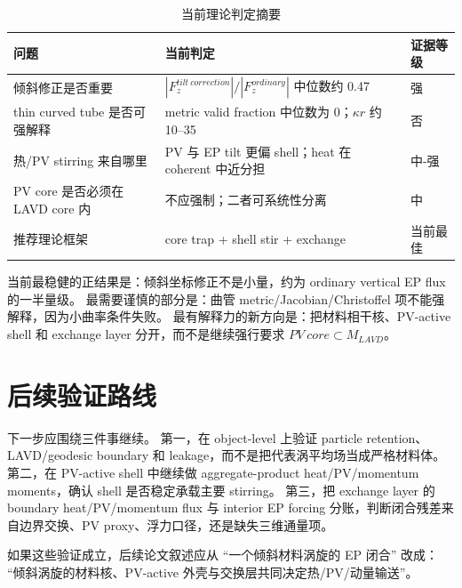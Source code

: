 \documentclass[UTF8,12pt]{ctexart}
\begin{document}
\begin{table}[H]
\centering
\caption{当前理论判定摘要}
\begin{tabular}{p{4.0cm}p{8.6cm}p{2.1cm}}
\toprule
问题 & 当前判定 & 证据等级\\
\midrule
倾斜修正是否重要 & \(|F_z^{tilt\ correction}|/|F_z^{ordinary}|\) 中位数约 0.47 & 强\\
thin curved tube 是否可强解释 & metric valid fraction 中位数为 0；\(\kappa r\) 约 10--35 & 否\\
热/PV stirring 来自哪里 & PV 与 EP tilt 更偏 shell；heat 在 coherent 中近分担 & 中-强\\
PV core 是否必须在 LAVD core 内 & 不应强制；二者可系统性分离 & 中\\
推荐理论框架 & core trap + shell stir + exchange & 当前最佳\\
\bottomrule
\end{tabular}
\end{table}

当前最稳健的正结果是：倾斜坐标修正不是小量，约为 ordinary vertical EP flux 的一半量级。
最需要谨慎的部分是：曲管 metric/Jacobian/Christoffel 项不能强解释，因为小曲率条件失败。
最有解释力的新方向是：把材料相干核、PV-active shell 和 exchange layer 分开，而不是继续强行要求 \(PV\ core \subset M_{LAVD}\)。

\section{后续验证路线}

下一步应围绕三件事继续。
第一，在 object-level 上验证 particle retention、LAVD/geodesic boundary 和 leakage，而不是把代表涡平均场当成严格材料体。
第二，在 PV-active shell 中继续做 aggregate-product heat/PV/momentum moments，确认 shell 是否稳定承载主要 stirring。
第三，把 exchange layer 的 boundary heat/PV/momentum flux 与 interior EP forcing 分账，判断闭合残差来自边界交换、PV proxy、浮力口径，还是缺失三维通量项。

如果这些验证成立，后续论文叙述应从 ``一个倾斜材料涡旋的 EP 闭合'' 改成：
``倾斜涡旋的材料核、PV-active 外壳与交换层共同决定热/PV/动量输送''。
\end{document}
